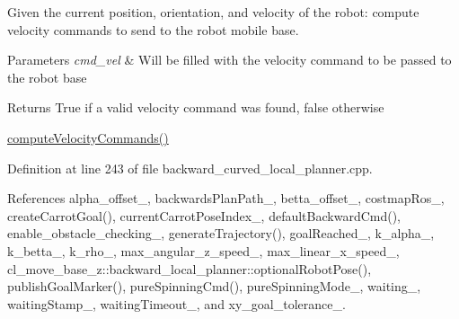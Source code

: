Given the current position, orientation, and velocity of the robot\+: compute velocity commands to send to the robot mobile base. 


\begin{DoxyParams}{Parameters}
{\em cmd\+\_\+vel} & Will be filled with the velocity command to be passed to the robot base \\
\hline
\end{DoxyParams}
\begin{DoxyReturn}{Returns}
True if a valid velocity command was found, false otherwise
\end{DoxyReturn}
\hyperlink{classcl__move__base__z_1_1backward__local__planner_1_1BackwardLocalPlanner_a25437208766366ca22f967fe72e80988}{compute\+Velocity\+Commands()} 

Definition at line 243 of file backward\+\_\+curved\+\_\+local\+\_\+planner.\+cpp.



References alpha\+\_\+offset\+\_\+, backwards\+Plan\+Path\+\_\+, betta\+\_\+offset\+\_\+, costmap\+Ros\+\_\+, create\+Carrot\+Goal(), current\+Carrot\+Pose\+Index\+\_\+, default\+Backward\+Cmd(), enable\+\_\+obstacle\+\_\+checking\+\_\+, generate\+Trajectory(), goal\+Reached\+\_\+, k\+\_\+alpha\+\_\+, k\+\_\+betta\+\_\+, k\+\_\+rho\+\_\+, max\+\_\+angular\+\_\+z\+\_\+speed\+\_\+, max\+\_\+linear\+\_\+x\+\_\+speed\+\_\+, cl\+\_\+move\+\_\+base\+\_\+z\+::backward\+\_\+local\+\_\+planner\+::optional\+Robot\+Pose(), publish\+Goal\+Marker(), pure\+Spinning\+Cmd(), pure\+Spinning\+Mode\+\_\+, waiting\+\_\+, waiting\+Stamp\+\_\+, waiting\+Timeout\+\_\+, and xy\+\_\+goal\+\_\+tolerance\+\_\+.


